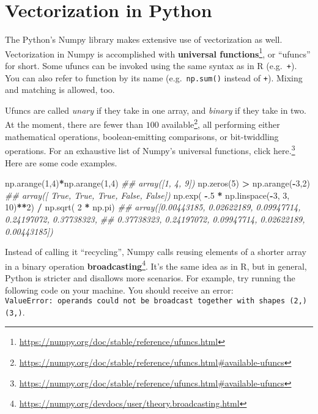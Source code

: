 \documentclass[
  12pt,
  krantz2]{krantz}
\makeatletter
\newenvironment{Shaded}{\begin{snugshade}}{\end{snugshade}}
\newcommand{\CommentTok}[1]{\textcolor[rgb]{0.37,0.37,0.37}{\textit{#1}}}
\newcommand{\DecValTok}[1]{\textcolor[rgb]{0.06,0.06,0.06}{#1}}
\newcommand{\FloatTok}[1]{\textcolor[rgb]{0.06,0.06,0.06}{#1}}
\newcommand{\NormalTok}[1]{#1}
\newcommand{\OperatorTok}[1]{\textcolor[rgb]{0.43,0.43,0.43}{\textbf{#1}}}
\renewcommand{\href}[2]{#2\footnote{\url{#1}}}
\newenvironment{kframe}{%
\medskip{}
\setlength{\fboxsep}{.8em}
 \def\at@end@of@kframe{}%
 \ifinner\ifhmode%
  \def\at@end@of@kframe{\end{minipage}}%
  \begin{minipage}{\columnwidth}%
 \fi\fi%
 \def\FrameCommand##1{\hskip\@totalleftmargin \hskip-\fboxsep
 \colorbox{shadecolor}{##1}\hskip-\fboxsep
     \hskip-\linewidth \hskip-\@totalleftmargin \hskip\columnwidth}%
 \MakeFramed {\advance\hsize-\width
   \@totalleftmargin\z@ \linewidth\hsize
   \@setminipage}}%
 {\par\unskip\endMakeFramed%
 \at@end@of@kframe}
\renewenvironment{Shaded}{\begin{kframe}}{\end{kframe}}
\makeatother
\begin{document}
\hypertarget{vectorization-in-python}{%
\section{Vectorization in Python}\label{vectorization-in-python}}

The Python's Numpy library makes extensive use of vectorization as well. Vectorization in Numpy is accomplished with \href{https://numpy.org/doc/stable/reference/ufuncs.html}{\textbf{universal functions}}, or ``ufuncs'' for short. Some ufuncs can be invoked using the same syntax as in R (e.g.~\texttt{+}). You can also refer to function by its name (e.g.~\texttt{np.sum()} instead of \texttt{+}). Mixing and matching is allowed, too.

Ufuncs are called \emph{unary} if they take in one array, and \emph{binary} if they take in two. At the moment, there are \href{https://numpy.org/doc/stable/reference/ufuncs.html\#available-ufuncs}{fewer than \(100\) available}, all performing either mathematical operations, boolean-emitting comparisons, or bit-twiddling operations. For an exhaustive list of Numpy's universal functions, \href{https://numpy.org/doc/stable/reference/ufuncs.html\#available-ufuncs}{click here.} Here are some code examples.

\begin{Shaded}
\begin{Highlighting}[]
\NormalTok{np.arange(}\DecValTok{1}\NormalTok{,}\DecValTok{4}\NormalTok{)}\OperatorTok{*}\NormalTok{np.arange(}\DecValTok{1}\NormalTok{,}\DecValTok{4}\NormalTok{)}
\CommentTok{\#\# array([1, 4, 9])}
\NormalTok{np.zeros(}\DecValTok{5}\NormalTok{) }\OperatorTok{\textgreater{}}\NormalTok{ np.arange(}\OperatorTok{{-}}\DecValTok{3}\NormalTok{,}\DecValTok{2}\NormalTok{)}
\CommentTok{\#\# array([ True,  True,  True, False, False])}
\NormalTok{np.exp( }\OperatorTok{{-}}\FloatTok{.5} \OperatorTok{*}\NormalTok{ np.linspace(}\OperatorTok{{-}}\DecValTok{3}\NormalTok{, }\DecValTok{3}\NormalTok{, }\DecValTok{10}\NormalTok{)}\OperatorTok{**}\DecValTok{2}\NormalTok{) }\OperatorTok{/}\NormalTok{ np.sqrt( }\DecValTok{2} \OperatorTok{*}\NormalTok{ np.pi)}
\CommentTok{\#\# array([0.00443185, 0.02622189, 0.09947714, 0.24197072, 0.37738323,}
\CommentTok{\#\#        0.37738323, 0.24197072, 0.09947714, 0.02622189, 0.00443185])}
\end{Highlighting}
\end{Shaded}

Instead of calling it ``recycling'', Numpy calls reusing elements of a shorter array in a binary operation \href{https://numpy.org/devdocs/user/theory.broadcasting.html}{\textbf{broadcasting}}. It's the same idea as in R, but in general, Python is stricter and disallows more scenarios. For example, try running the following code on your machine. You should receive an error: \texttt{ValueError:\ operands\ could\ not\ be\ broadcast\ together\ with\ shapes\ (2,)\ (3,)}.
\end{document}
